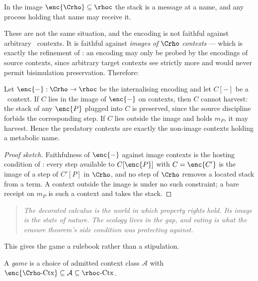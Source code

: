 In the image $\enc{\Crho} \subseteq \rhoc$ the stack is a message at a name, and any process holding
that name may receive it.

These are not the same situation, and the encoding is not faithful against arbitrary \rhoc\ contexts.
It is faithful against \emph{images of $\Crho$ contexts} --- which is exactly the refinement of
\cite{Probing}: an encoding may only be probed by the encodings of source contexts, since arbitrary
target contexts see strictly more and would never permit bisimulation preservation. Therefore:

\begin{theorem}
\label{sci:thm:predator}
Let $\enc{-} : \Crho \to \rhoc$ be the internalising encoding and let $C[-]$ be a \rhoc\ context. If
$C$ lies in the image of $\enc{-}$ on contexts, then $C$ cannot harvest: the stack of any
$\enc{P}$ plugged into $C$ is preserved, since the source discipline forbids the corresponding step.
If $C$ lies outside the image and holds $m_P$, it may harvest. Hence the predatory contexts are
exactly the non-image contexts holding a metabolic name.
\end{theorem}

\begin{proof}[Proof sketch]
Faithfulness of $\enc{-}$ against image contexts is the hosting condition of \cite{Probing}: every
step available to $C[\enc{P}]$ with $C = \enc{C'}$ is the image of a step of $C'[P]$ in $\Crho$, and
no step of $\Crho$ removes a located stack from a term. A context outside the image is under no such
constraint; a bare receipt on $m_P$ is such a context and takes the stack.
\end{proof}

\begin{quote}
\itshape The decorated calculus is the world in which property rights hold. Its image is the state of
nature. The ecology lives in the gap, and eating is what the erasure theorem's side condition was
protecting against.
\end{quote}

This gives the game a rulebook rather than a stipulation.

\begin{definition}
\label{sci:def:game}
A \emph{game} is a choice of admitted context class $\mathcal{A}$ with
$\enc{\Crho\text{-}\mathrm{Ctx}} \subseteq \mathcal{A} \subseteq \rhoc\text{-}\mathrm{Ctx}$.
\end{definition}

